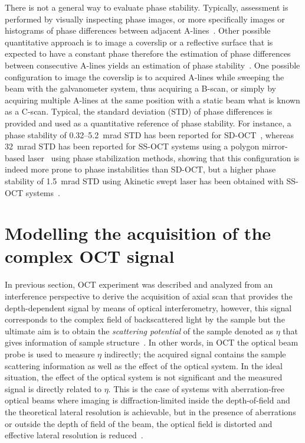 There is not a general way to evaluate phase stability. Typically, assessment is performed by visually inspecting phase images, or more specifically images or histograms of phase differences between adjacent A-lines~\cite{Minneman2015_MEMS}. Other possible quantitative approach is to image a coverslip or a reflective surface that is expected to have a constant phase therefore the estimation of phase differences between consecutive A-lines yields an estimation of phase stability~\cite{Minneman2015_MEMS}. One possible configuration to image the coverslip is to acquired A-lines while sweeping the beam with the galvanometer system, thus acquiring a B-scan, or simply by acquiring multiple A-lines at the same position with a static beam what is known as a C-scan. Typical, the standard deviation (STD) of phase differences is provided and used as a quantitative reference of phase stability. For instance, a phase stability of 0.32–5.2~mrad STD has been reported for SD-OCT~\cite{White2003_vivo, Joo2005_Spectraldomain}, whereas 32~mrad STD has been reported for SS-OCT systems using a polygon mirror-based laser~\cite{Manapuram2009_Phasesensitive} using phase stabilization methods, showing that this configuration is indeed more prone to phase instabilities than SD-OCT, but a higher phase stability of 1.5~mrad STD using Akinetic swept laser has been obtained with SS-OCT systems~\cite{Choi2013_Phasesensitive}.

\section{Modelling the acquisition of the complex OCT signal}\label{Model}

In previous section, OCT experiment was described and analyzed from an interference perspective to derive the acquisition of axial scan that provides the depth-dependent signal by means of optical interferometry, however, this signal corresponds to the complex field of backscattered light by the sample but the ultimate aim is to obtain the \textit{scattering potential} of the sample denoted as $\eta$ that gives information of sample structure~\cite{Ralston2006_Inverse}. In other words, in OCT the optical beam probe is used to measure $\eta$ indirectly; the acquired signal contains the sample scattering information as well as the effect of the optical system. In the ideal situation, the effect of the optical system is not significant and the measured signal is directly related to $\eta$. This is the case of systems with aberration-free optical beams where imaging is diffraction-limited inside the depth-of-field and the theoretical lateral resolution is achievable, but in the presence of aberrations or outside the depth of field of the beam, the optical field is distorted and effective lateral resolution is reduced~\cite{Ralston2006_Inverse}.

